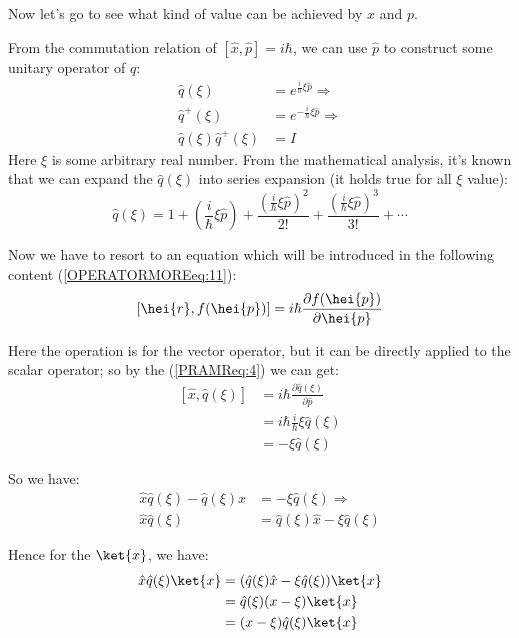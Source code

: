 Now let's go to see what kind of value can be achieved by $x$ and
$p$.

From the commutation relation of $[\hat{x}, \hat{p}] = i\hbar$, we can
use $\hat{p}$ to construct some unitary operator of $\hat{q}$:
\begin{align}
  \label{PRAMReq:2}
\hat{q}(\xi) &= e^{\frac{i}{\hbar}\xi\hat{p}} \Rightarrow \nonumber \\
\hat{q}^{+}(\xi) &= e^{-\frac{i}{\hbar}\xi\hat{p}} \Rightarrow
\nonumber \\
\hat{q}(\xi)\hat{q}^{+}(\xi) &= I
\end{align}
Here $\xi$ is some arbitrary real number. From the mathematical
analysis, it's known that we can expand the $\hat{q}(\xi)$ into series
expansion (it holds true for all $\xi$ value):
\begin{equation}
  \label{PRAMReq:3}
  \hat{q}(\xi) = 1 + \left(\frac{i}{\hbar}\xi\hat{p}\right) +
 \frac{\left(\frac{i}{\hbar}\xi\hat{p}\right)^{2}}{2!} +
\frac{\left(\frac{i}{\hbar}\xi\hat{p}\right)^{3}}{3!} + \cdots
\end{equation}

Now we have to resort to an equation which will be introduced in the
following content (\ref{OPERATORMOREeq:11}):
\begin{equation}
  \label{PRAMReq:4}
[\hei{r}, f(\hei{p})] = i\hbar \frac{\partial f(\hei{p})}{\partial
\hei{p}}
\end{equation}

Here the operation is for the vector operator, but it can be directly
applied to the scalar operator; so by the (\ref{PRAMReq:4}) we can
get:
\begin{align}
  \label{PRAMReq:5}
    [\hat{x}, \hat{q}(\xi)] &=
i\hbar \frac{\partial\hat{q}(\xi)}{\partial \hat{p}} \nonumber \\
&=i\hbar \frac{i}{\hbar}\xi\hat{q}(\xi) \nonumber \\
&=-\xi\hat{q}(\xi)
\end{align}

So we have:
\begin{align}
  \label{PRAMReq:6}
\hat{x}\hat{q}(\xi) - \hat{q}(\xi)\hat{x} &= -\xi\hat{q}(\xi)
\Rightarrow \nonumber \\
\hat{x}\hat{q}(\xi) &= \hat{q}(\xi)\hat{x} - \xi\hat{q}(\xi)
\end{align}

Hence for the $\ket{x}$, we have:
\begin{align}
  \label{PRAMReq:7}
\hat{x}\hat{q}(\xi)\ket{x} &= (\hat{q}(\xi)\hat{x} -
\xi\hat{q}(\xi))\ket{x} \nonumber \\
&=\hat{q}(\xi) (x - \xi)\ket{x} \nonumber \\
&=(x - \xi)\hat{q}(\xi)\ket{x}
\end{align}

